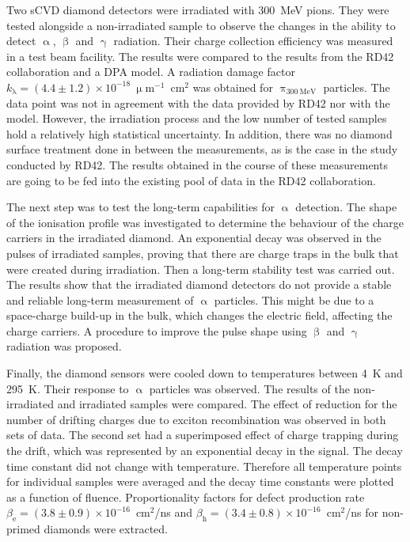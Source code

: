 Two sCVD diamond detectors were irradiated with 300~MeV pions. They were tested alongside a non-irradiated sample to observe the changes in the ability to detect $\upalpha$, $\upbeta$ and $\upgamma$ radiation. Their charge collection efficiency was measured in a test beam facility. The results were compared to the results from the RD42 collaboration and a DPA model. A radiation damage factor $k_{\mathrm{\lambda}}=(4.4\pm1.2)\times10^{-18}~\upmu$m$^{-1}$~cm$^{2}$ was obtained for $\uppi_{\mathrm{300~MeV}}$ particles. The data point was not in agreement with the data provided by RD42 nor with the model. However, the irradiation process and the low number of tested samples hold a relatively high statistical uncertainty. In addition, there was no diamond surface treatment done in between the measurements, as is the case in the study conducted by RD42. The results obtained in the course of these measurements are going to be fed into the existing pool of data in the RD42 collaboration.

The next step was to test the long-term capabilities for $\upalpha$ detection. The shape of the ionisation profile was investigated to determine the behaviour of the charge carriers in the irradiated diamond. An exponential decay was observed in the pulses of irradiated samples, proving that there are charge traps in the bulk that were created during irradiation. Then a long-term stability test was carried out. The results show that the irradiated diamond detectors do not provide a stable and reliable long-term measurement of $\upalpha$ particles. This might be due to a space-charge build-up in the bulk, which changes the electric field, affecting the charge carriers. A procedure to improve the pulse shape using $\upbeta$ and $\upgamma$ radiation was proposed.

Finally, the diamond sensors were cooled down to temperatures between 4~K and 295~K. Their response to $\upalpha$ particles was observed. The results of the non-irradiated and irradiated samples were compared. The effect of reduction for the number of drifting charges due to exciton recombination was observed in both sets of data. The second set had a superimposed effect of charge trapping during the drift, which was represented by an exponential decay in the signal. The decay time constant did not change with temperature. Therefore all temperature points for individual samples were averaged and the decay time constants were plotted as a function of fluence. Proportionality factors for defect production rate $\beta_\mathrm{e}=(3.8\pm0.9)\times10^{-16}$~cm$^2$/ns and $\beta_\mathrm{h}=(3.4\pm0.8)\times10^{-16}$~cm$^2$/ns for non-primed diamonds were extracted.
